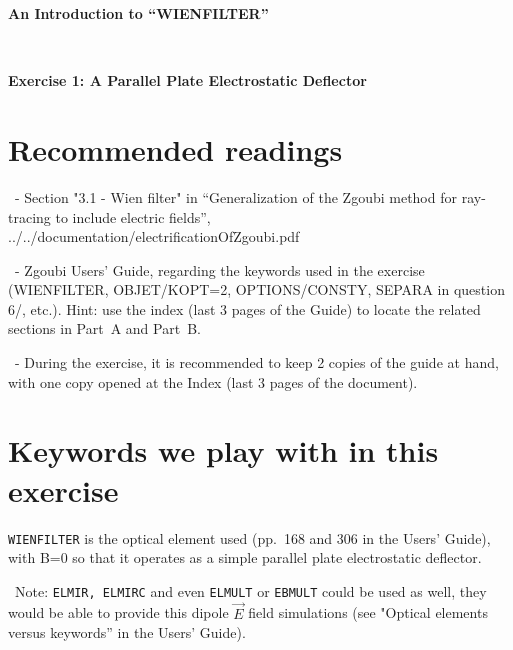 \documentclass[10pt]{article}
\newcommand{\nin}{\noindent~}
\begin{document}
\thispagestyle{empty}

\begin{minipage}{1.\linewidth}
\bf
\vspace{-2ex}
  
\vspace{-2ex}
  
\vspace{-2ex}
  
\end{minipage}


\vspace{5ex}

\centerline{\LARGE \bf
  An Introduction to  ``WIENFILTER'' 
}

~

\centerline{\LARGE \bf
Exercise 1: A Parallel Plate Electrostatic Deflector
}


\section*{Recommended readings}

\nin - Section  "3.1 - Wien filter"  in 
``Generalization of the Zgoubi method for ray-tracing to include electric fields'', \\
../../documentation/electrificationOfZgoubi.pdf

\smallskip
\nin - Zgoubi Users' Guide, regarding the keywords used in the exercise (WIENFILTER, OBJET/KOPT=2, OPTIONS/CONSTY, SEPARA in question 6/, etc.). Hint: use the index (last 3 pages of the Guide) to locate the related sections in Part~A and Part~B. 


\smallskip
\nin - During the exercise, it is recommended to keep 2 copies of the guide at hand, with one copy opened at the Index (last 3 pages of the document).

\section*{Keywords we play with in this exercise}

\texttt{WIENFILTER} is the optical element used  (pp.~168 and 306 in the Users' Guide), with B=0  so that it operates as a simple parallel plate electrostatic deflector.

\nin Note: \texttt{ELMIR, ELMIRC} and even \texttt{ELMULT} or \texttt{EBMULT}  could be used as well, they would be able to provide this dipole $ \vec E$ field simulations (see "Optical elements versus keywords'' in the Users' Guide).
\end{document}
